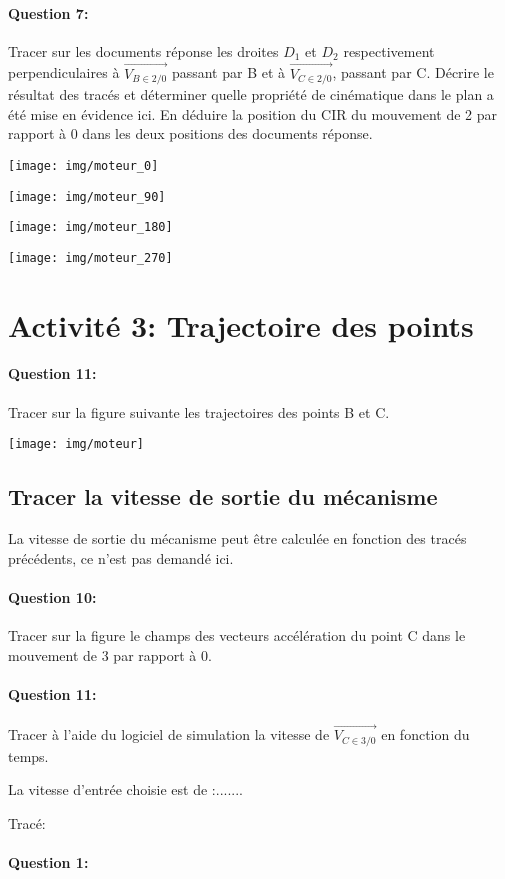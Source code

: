 \paragraph{Question 7:} Tracer sur les documents réponse les droites $D_1$ et $D_2$ respectivement perpendiculaires à $\overrightarrow{V_{B\in 2/0}}$ passant par B et à $\overrightarrow{V_{C\in 2/0}}$, passant par C. Décrire le résultat des tracés et déterminer quelle propriété de cinématique dans le plan a été mise en évidence ici. En déduire la position du CIR du mouvement de 2 par rapport à 0 dans les deux positions des documents réponse.

\texttt{[image: img/moteur\_0]}

\vspace{2cm}

\texttt{[image: img/moteur\_90]}

\vspace{2cm}

\texttt{[image: img/moteur\_180]}

\vspace{2cm}

\texttt{[image: img/moteur\_270]}

\section{Activité 3: Trajectoire des points}

\paragraph{Question 11:} Tracer sur la figure suivante les trajectoires des points B et C.

\vspace{1cm}

\texttt{[image: img/moteur]}

\subsection{Tracer la vitesse de sortie du mécanisme}

La vitesse de sortie du mécanisme peut être calculée en fonction des tracés précédents, ce n'est pas demandé ici.

\paragraph{Question 10:} Tracer sur la figure le champs des vecteurs accélération du point C dans le mouvement de 3 par rapport à 0.

\paragraph{Question 11:} Tracer à l'aide du logiciel de simulation la vitesse de $\overrightarrow{V_{C\in 3/0}}$ en fonction du temps.

\newpage

La vitesse d'entrée choisie est de :.......

Tracé:
\vspace{10cm}




\pagestyle{correction}\setcounter{section}{0}

\paragraph{Question 1:}
